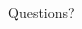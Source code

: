 \documentclass[aspectratio=169]{beamer}
\begin{document}
\begin{frame}
\begin{columns}
\begin{column}{0.5\textwidth}
    \end{column}
  \end{columns}
\end{frame}

\begin{frame}
  \begin{center}
  Questions?
  \end{center}
\end{frame}
\end{document}
